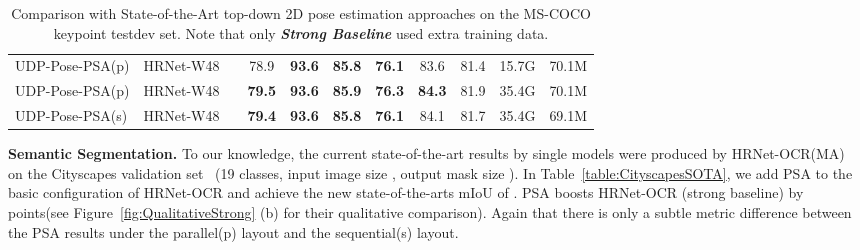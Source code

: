 \documentclass[10pt,twocolumn,letterpaper]{article}
\begin{document}
\begin{table*}[t]
\begin{tabular}{l|c|c|c|ccccc|c|c}
UDP-Pose-PSA(p)      & HRNet-W48   &   & 78.9 & \textbf{93.6} & \textbf{85.8} & \textbf{76.1} & 83.6 &  81.4 & 15.7G & 70.1M  \\
UDP-Pose-PSA(p)      & HRNet-W48  &  & \textbf{79.5} & \textbf{93.6} & \textbf{85.9} & \textbf{76.3} & \textbf{84.3} & 81.9 &35.4G &70.1M  \\
UDP-Pose-PSA(s)      & HRNet-W48  &  & \textbf{79.4} & \textbf{93.6} & \textbf{85.8} & \textbf{76.1} & 84.1 & 81.7 &35.4G &69.1M  \\
 \hline
\end{tabular}
\caption{ Comparison with State-of-the-Art top-down 2D pose estimation approaches on the MS-COCO keypoint testdev set. Note that only \cite{Huang2020}\textbf{\textsl{Strong Baseline}} used extra training data.}
\label{table:CocoSOTA}
\end{table*}


\textbf{Semantic Segmentation.} To our knowledge, the current state-of-the-art results by single models were produced by HRNet-OCR(MA)~\cite{Tao2020} on the Cityscapes validation set {~\cite{Cordts16}}(19 classes, input image size , output mask size ). In Table~\ref{table:CityscapesSOTA}, we add PSA to the basic configuration of HRNet-OCR and achieve the new state-of-the-arts mIoU of . PSA boosts HRNet-OCR (strong baseline) by  points(see Figure~\ref{fig:QualitativeStrong} (b) for their qualitative comparison). Again that there is only a subtle metric difference between the PSA results under the parallel(p) layout and the sequential(s) layout.
\end{document}
